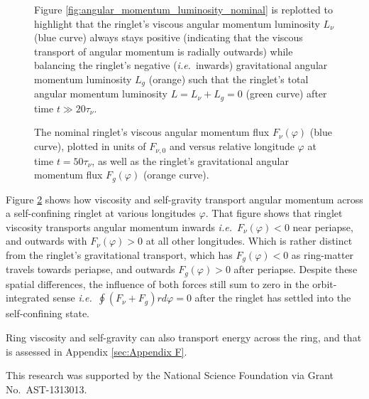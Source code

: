 \documentclass[preprint]{aastex62}
\begin{document}
\begin{figure}
    \caption{
        \label{fig:angular_momentum_luminosity_zoom_nominal}
        Figure \ref{fig:angular_momentum_luminosity_nominal} is replotted to highlight that the ringlet's 
        viscous angular momentum luminosity $L_\nu$ (blue curve)
        always stays positive (indicating that the viscous transport of angular momentum is radially outwards) while balancing
        the ringlet's negative ({\it i.e.}\ inwards) gravitational angular momentum luminosity 
        $L_g$ (orange) such that the ringlet's total angular momentum luminosity $L=L_\nu+L_g=0$  (green curve)
        after time $t\gg20\tau_\nu$.
    }
\end{figure}

\begin{figure}
    \caption{
        \label{fig:F_vs_longitude_nominal}
        The nominal ringlet's viscous angular momentum flux $F_{\nu}(\varphi)$ (blue curve), plotted in units of $F_{\nu,0}$
        and versus relative longitude $\varphi$ at time $t=50\tau_\nu$, as well as the ringlet's gravitational
        angular momentum flux $F_{g}(\varphi)$ (orange curve).
    }
\end{figure}

Figure \ref{fig:F_vs_longitude_nominal} shows how viscosity and self-gravity transport angular
momentum across a self-confining ringlet at various longitudes $\varphi$. That figure shows that ringlet viscosity
transports angular momentum inwards {\it i.e.}\ $F_{\nu}(\varphi)<0$ near periapse, and outwards 
with $F_{\nu}(\varphi)>0$ at all other longitudes. Which is rather distinct from the ringlet's gravitational
transport, which has $F_{g}(\varphi)<0$ as
ring-matter travels towards periapse, and outwards $F_{g}(\varphi)>0$ after periapse.
Despite these spatial differences, the influence of both forces still sum to zero
in the orbit-integrated sense {\it i.e.}\ $\oint (F_\nu+F_g)rd\varphi=0$ after the ringlet has
settled into the self-confining state.

Ring viscosity and self-gravity can also transport energy across the ring, 
and that is assessed in Appendix \ref{sec:Appendix F}.

\acknowledgments

This research was supported by the National Science Foundation via Grant No.\ AST-1313013.

\appendix
\end{document}
